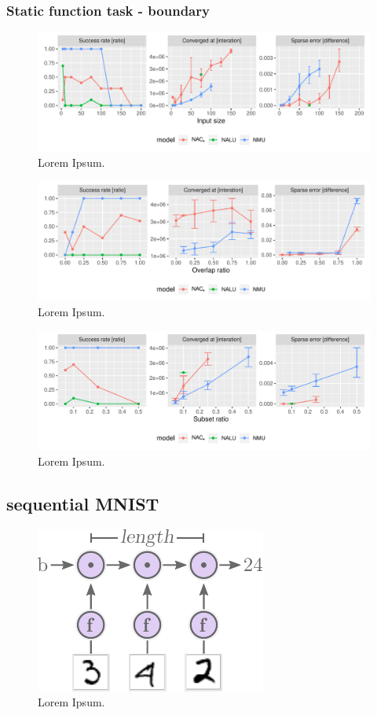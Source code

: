 \subsubsection{Static function task - boundary}
\begin{figure}[H]
\centering
\includegraphics[width=\linewidth]{results/simple_function_static_input_size.pdf}
\caption{Lorem Ipsum.}
\end{figure}

\begin{figure}[H]
\centering
\includegraphics[width=\linewidth]{results/simple_function_static_overlap.pdf}
\caption{Lorem Ipsum.}
\end{figure}

\begin{figure}[H]
\centering
\includegraphics[width=\linewidth]{results/simple_function_static_subset.pdf}
\caption{Lorem Ipsum.}
\end{figure}

\subsection{sequential MNIST}

\begin{figure}[H]
\centering
\includegraphics[scale=1]{graphics/mnist_sequence_problem.pdf}
\caption{Lorem Ipsum.}
\end{figure}

